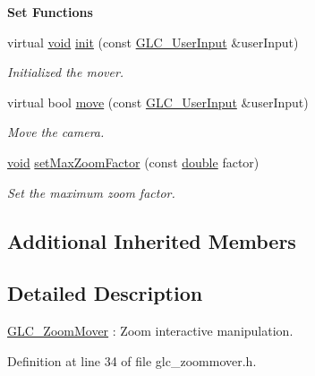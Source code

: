 \begin{Indent}{\bf Set Functions}\par
\begin{DoxyCompactItemize}
\item 
virtual \hyperlink{group___u_a_v_objects_plugin_ga444cf2ff3f0ecbe028adce838d373f5c}{void} \hyperlink{class_g_l_c___zoom_mover_af44b07ea2addcacfd5061f9f5dd5f63b}{init} (const \hyperlink{class_g_l_c___user_input}{G\-L\-C\-\_\-\-User\-Input} \&user\-Input)
\begin{DoxyCompactList}\small\item\em Initialized the mover. \end{DoxyCompactList}\item 
virtual bool \hyperlink{class_g_l_c___zoom_mover_aa6f260134db8d0f6599a265c2433dbd9}{move} (const \hyperlink{class_g_l_c___user_input}{G\-L\-C\-\_\-\-User\-Input} \&user\-Input)
\begin{DoxyCompactList}\small\item\em Move the camera. \end{DoxyCompactList}\item 
\hyperlink{group___u_a_v_objects_plugin_ga444cf2ff3f0ecbe028adce838d373f5c}{void} \hyperlink{class_g_l_c___zoom_mover_abffffbee539bef08d4f6f126da84f78e}{set\-Max\-Zoom\-Factor} (const \hyperlink{_super_l_u_support_8h_a8956b2b9f49bf918deed98379d159ca7}{double} factor)
\begin{DoxyCompactList}\small\item\em Set the maximum zoom factor. \end{DoxyCompactList}\end{DoxyCompactItemize}
\end{Indent}
\subsection*{Additional Inherited Members}


\subsection{Detailed Description}
\hyperlink{class_g_l_c___zoom_mover}{G\-L\-C\-\_\-\-Zoom\-Mover} \-: Zoom interactive manipulation. 

Definition at line 34 of file glc\-\_\-zoommover.\-h.



